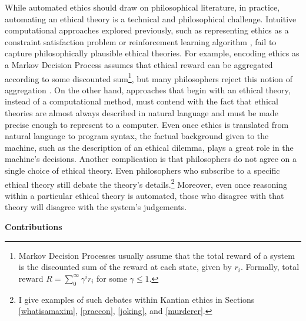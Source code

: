 \begin{isabellebody}
\begin{isamarkuptext}
While automated ethics should draw on philosophical literature, in practice, automating an ethical 
theory is a technical and philosophical challenge. Intuitive computational approaches explored 
previously, such as representing ethics as a constraint satisfaction problem \citep{csp} or reinforcement 
learning algorithm \citep{util1}, fail to capture philosophically plausible ethical theories. For 
example, encoding ethics as a Markov Decision Process assumes that ethical reward can be aggregated 
according to some discounted sum\footnote{Markov Decision Processes usually assume that the total
reward of a system is the discounted sum of the reward at each state, given by $r_i$. Formally, total
reward $R=\sum_0^{\infty}\gamma^ir_i$ for some $\gamma \leq 1$.}, but many philosophers reject 
this notion of aggregation \citep{consequentialismsep}. 
On the other hand, approaches that begin with an ethical theory, instead of a computational method, must contend with the 
fact that ethical theories are almost always described in natural language and must be made
precise enough to represent to a computer. Even once ethics is translated from natural 
language to program syntax, the factual background given to the machine, such as the description of 
an ethical dilemma, plays a great role in the machine's decisions. Another complication
is that philosophers do not agree on a single choice of ethical theory. Even philosophers who
subscribe to a specific ethical theory still debate the theory's 
details.\footnote{I give examples of such debates within Kantian ethics in Sections \ref{whatisamaxim}, 
\ref{praccon}, \ref{joking}, and \ref{murderer}.} Moreover, even once reasoning within a 
particular ethical theory is automated, those who disagree with that theory will disagree with the 
system's judgements.

\noindent \textbf{Contributions}

\medskip 


\end{isamarkuptext}
\end{isabellebody}
